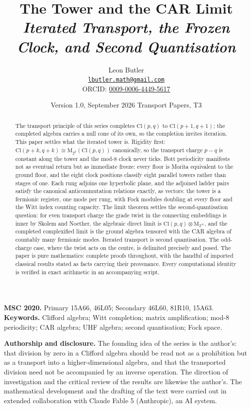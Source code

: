 \documentclass[11pt]{article}
\title{\bfseries The Tower and the CAR Limit\\[4pt]
  \large\itshape Iterated Transport, the Frozen Clock, and Second Quantisation}
\author{Leon Butler\\ \normalsize\href{mailto:lbutler.math@gmail.com}{\texttt{lbutler.math@gmail.com}}\\ \normalsize ORCID: \href{https://orcid.org/0009-0006-4449-5617}{0009-0006-4449-5617}}
\date{Version 1.0, September 2026 \textperiodcentered{} Transport Papers, T3}
\theoremstyle{definition}
\newcommand{\Cl}{\mathrm{Cl}}
\newcommand{\Mat}{\mathrm{M}}
\begin{document}
\maketitle

\begin{abstract}
\normalsize
The transport principle of this series completes $\Cl(p,q)$ to $\Cl(p{+}1,q{+}1)$; the completed algebra carries a null cone of its own, so the completion invites iteration. This paper settles what the iterated tower is. Rigidity first: $\Cl(p{+}k, q{+}k) \cong \Mat_{2^k}(\Cl(p,q))$ canonically, so the transport charge $p - q$ is constant along the tower and the mod-8 clock never ticks. Bott periodicity manifests not as eventual return but as immediate freeze: every floor is Morita equivalent to the ground floor, and the eight clock positions classify eight parallel towers rather than stages of one. Each rung adjoins one hyperbolic plane, and the adjoined ladder pairs satisfy the canonical anticommutation relations exactly, as vectors: the tower is a fermionic register, one mode per rung, with Fock modules doubling at every floor and the Witt index counting capacity. The limit theorem settles the second-quantisation question: for even transport charge the grade twist in the connecting embeddings is inner by Skolem and Noether, the algebraic direct limit is $\Cl(p,q) \otimes \Mat_{2^\infty}$, and the completed complexified limit is the ground algebra tensored with the CAR algebra of countably many fermionic modes. Iterated transport is second quantisation. The odd-charge case, where the twist acts on the centre, is delimited precisely and posed. The paper is pure mathematics: complete proofs throughout, with the handful of imported classical results stated as facts carrying their provenance. Every computational identity is verified in exact arithmetic in an accompanying script.
\end{abstract}

\medskip
\noindent\textbf{MSC 2020.} Primary 15A66, 46L05; Secondary 46L60, 81R10, 15A63.\\
\textbf{Keywords.} Clifford algebra; Witt completion; matrix amplification; mod-8 periodicity; CAR algebra; UHF algebra; second quantisation; Fock space.

\newpage
\textbf{Authorship and disclosure. }The founding idea of the series is the author's: that division by zero in a Clifford algebra should be read not as a prohibition but as a transport into a higher-dimensional algebra, and that the transported division need not be accompanied by an inverse operation. The direction of investigation and the critical review of the results are likewise the author's. The mathematical development and the drafting of the text were carried out in extended collaboration with Claude Fable 5 (Anthropic), an AI system.
\end{document}
